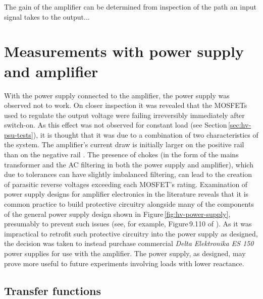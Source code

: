 
The gain of the amplifier can be determined from inspection of the path an input signal takes to the output... 

\section{\label{sec:hv-psu-amp-measurements}Measurements with power supply and amplifier}

With the power supply connected to the amplifier, the power supply was observed not to work. On closer inspection it was revealed that the \glspl{MOSFET} used to regulate the output voltage were failing irreversibly immediately after switch-on. As this effect was not observed for constant load (see Section\,\ref{sec:hv-psu-tests}), it is thought that it was due to a combination of two characteristics of the system. The amplifier's current draw is initially larger on the positive rail than on the negative rail . The presence of chokes (in the form of the mains transformer and the \gls{AC} filtering in both the power supply and amplifier), which due to tolerances can have slightly imbalanced filtering, can lead to the creation of parasitic reverse voltages exceeding each \gls{MOSFET}'s rating. Examination of power supply designs for amplifier electronics in the literature reveals that it is common practice to build protective circuitry alongside many of the components of the general power supply design shown in Figure\,\ref{fig:hv-power-supply}, presumably to prevent such issues (see, for example, Figure\,9.110 of \cite{Horowitz2015}). As it was impractical to retrofit such protective circuitry into the power supply as designed, the decision was taken to instead purchase commercial \emph{Delta Elektronika ES 150} power supplies for use with the amplifier. The power supply, as designed, may prove more useful to future experiments involving loads with lower reactance.

\subsection{Transfer functions}


